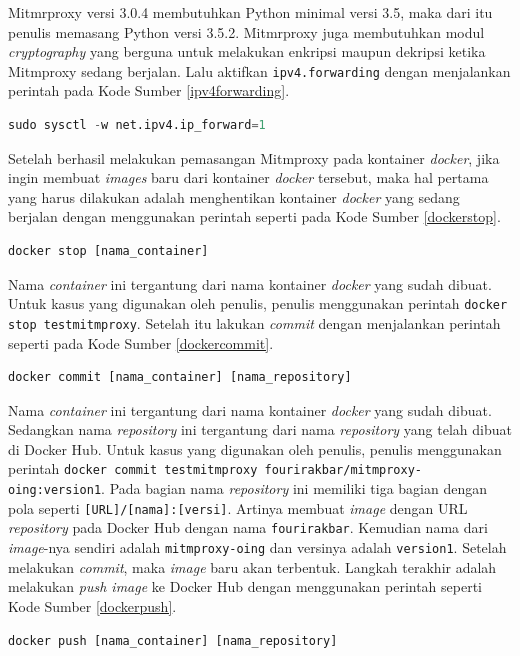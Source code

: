 Mitmrproxy versi 3.0.4 membutuhkan Python minimal versi 3.5, maka dari itu penulis memasang Python versi 3.5.2. Mitmrproxy juga membutuhkan modul \textit{cryptography} yang berguna untuk melakukan enkripsi maupun dekripsi ketika Mitmproxy sedang berjalan. Lalu aktifkan \texttt{ipv4.forwarding} dengan menjalankan perintah pada Kode Sumber \ref{ipv4forwarding}.
\newline
\begin{lstlisting}[frame=single,tabsize=2,breaklines,captionpos=b,caption=Perintah untuk Mengaktifkan \textit{ipv4.forwarding},language=Python,label=ipv4forwarding]
sudo sysctl -w net.ipv4.ip_forward=1
\end{lstlisting}
\indent Setelah berhasil melakukan pemasangan Mitmproxy pada kontainer \textit{docker}, jika ingin membuat \textit{images} baru dari kontainer \textit{docker} tersebut, maka hal pertama yang harus dilakukan adalah menghentikan kontainer \textit{docker} yang sedang berjalan dengan menggunakan perintah seperti pada Kode Sumber \ref{dockerstop}.
\newline
\begin{lstlisting}[frame=single,tabsize=2,breaklines,captionpos=b,caption=Perintah untuk Menghentikan Kontainer Docker,language=Python,label=dockerstop]
docker stop [nama_container]
\end{lstlisting}
Nama \textit{container} ini tergantung dari nama kontainer \textit{docker} yang sudah dibuat. Untuk kasus yang digunakan oleh penulis, penulis menggunakan perintah \texttt{docker stop testmitmproxy}. Setelah itu lakukan \textit{commit} dengan menjalankan perintah seperti pada Kode Sumber \ref{dockercommit}.
\newline
\begin{lstlisting}[frame=single,tabsize=2,breaklines,captionpos=b,caption=Perintah untuk \textit{Commit} Kontainer Docker,language=Python,label=dockercommit]
docker commit [nama_container] [nama_repository]
\end{lstlisting}
Nama \textit{container} ini tergantung dari nama kontainer \textit{docker} yang sudah dibuat. Sedangkan nama \textit{repository} ini tergantung dari nama \textit{repository} yang telah dibuat di Docker Hub. Untuk kasus yang digunakan oleh penulis, penulis menggunakan perintah \texttt{docker commit testmitmproxy fourirakbar/mitmproxy-oing:version1}. Pada bagian nama \textit{repository} ini memiliki tiga bagian dengan pola seperti \texttt{[URL]/[nama]:[versi]}. Artinya membuat \textit{image} dengan URL \textit{repository} pada Docker Hub dengan nama \texttt{fourirakbar}. Kemudian nama dari \textit{image}-nya sendiri adalah \texttt{mitmproxy-oing} dan versinya adalah \texttt{version1}. Setelah melakukan \textit{commit}, maka \textit{image} baru akan terbentuk. Langkah terakhir adalah melakukan \textit{push image} ke Docker Hub dengan menggunakan perintah seperti Kode Sumber \ref{dockerpush}.
\newline
\begin{lstlisting}[frame=single,tabsize=2,breaklines,captionpos=b,caption=Perintah untuk \textit{Push Image} ke Docker Hub,language=Python,label=dockerpush]
docker push [nama_container] [nama_repository]
\end{lstlisting}

